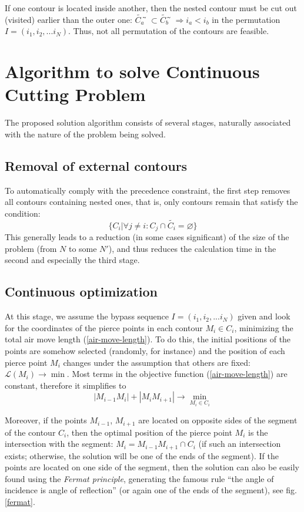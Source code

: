 \documentclass[]{interact}
\theoremstyle{plain}%
\theoremstyle{definition}
\theoremstyle{remark}
\begin{document}
If one contour is located inside another,
then the nested contour must be cut out
(visited)
earlier than the outer one:
$\tilde{C_a} ̃\subset \tilde{C_b} ̃\Rightarrow i_a < i_b$
in the permutation
$I = (i_1, i_2, ... i_N)$.
Thus, not all permutation of the contours are feasible.

\section{Algorithm to solve Continuous Cutting Problem}

The proposed solution algorithm
consists of several stages,
naturally associated with the nature of the problem being solved.

\subsection{Removal of external contours}

To automatically comply with the precedence constraint,
the first step removes all contours containing nested ones,
that is, only contours remain that satisfy the condition:
$$
\{C_i | \forall j \ne i: C_j \cap \tilde{C_i} = \varnothing \}
$$
This generally leads to a reduction
(in some cases significant)
of the size of the problem
(from $N$ to some $N'$),
and thus reduces the calculation time
in the second and especially the third stage.

\subsection{Continuous optimization}

At this stage,
we assume the bypass sequence
$I = (i_1, i_2, ... i_N)$
given and look for the coordinates of the pierce points
in each contour
$M_i \in C_i$,
minimizing the total air move length (\ref{air-move-length}).
To do this, the initial positions of the points are somehow selected
(randomly, for instance)
and the position of each pierce point $M_i$
changes under the assumption that others are fixed:
$\mathcal{L}(M_i) \to \min$.
Most terms in the objective function
(\ref{air-move-length})
are constant, therefore it simplifies to
$$
|M_{i-1}M_i|+|M_iM_{i+1}| \to \min_{M_i \in C_i}
$$

Moreover,
if the points
$M_{i-1}$,
$M_{i + 1}$
are located on opposite sides of the segment of the contour
$C_i$,
then the optimal position of the
pierce point $M_i$ is the intersection with the segment:
$M_i = M_{i-1} M_{i + 1} \cap C_i$
(if such an intersection exists;
otherwise,
the solution will be one of the ends of the segment).
If the points are located on one side of the segment,
then the solution can also be easily found using the
\textit{Fermat principle},
generating the famous rule
``the angle of incidence is angle of reflection''
(or again one of the ends of the segment),
see fig. \ref{fermat}.
\end{document}

